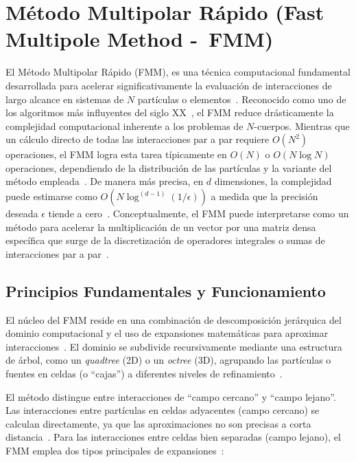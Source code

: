 \section[Método Multipolar Rápido]{Método Multipolar Rápido (Fast Multipole Method -\ FMM)}\label{subsec:fmm}

El Método Multipolar Rápido (FMM), es una técnica computacional fundamental desarrollada para acelerar significativamente la evaluación de interacciones de largo alcance en sistemas de $N$ partículas o elementos~\cite{GreengardRokhlin1987, Martinsson2012}. Reconocido como uno de los algoritmos más influyentes del siglo XX~\cite{Cipra2000}, el FMM reduce drásticamente la complejidad computacional inherente a los problemas de $N$-cuerpos. Mientras que un cálculo directo de todas las interacciones par a par requiere $O(N^2)$ operaciones, el FMM logra esta tarea típicamente en $O(N)$ o $O(N \log N)$ operaciones, dependiendo de la distribución de las partículas y la variante del método empleada~\cite{BeatsonGreengard1997, GreengardRokhlin1987}. De manera más precisa, en $d$ dimensiones, la complejidad puede estimarse como $O(N \log^{(d-1)}(1/\epsilon))$ a medida que la precisión deseada $\epsilon$ tiende a cero~\cite{Martinsson2012}. Conceptualmente, el FMM puede interpretarse como un método para acelerar la multiplicación de un vector por una matriz densa específica que surge de la discretización de operadores integrales o sumas de interacciones par a par~\cite{ChenSF, Martinsson2012}.

\subsection{Principios Fundamentales y Funcionamiento}

El núcleo del FMM reside en una combinación de descomposición jerárquica del dominio computacional y el uso de expansiones matemáticas para aproximar interacciones~\cite{GreengardRokhlin1987}. El dominio se subdivide recursivamente mediante una estructura de árbol, como un \textit{quadtree} (2D) o un \textit{octree} (3D), agrupando las partículas o fuentes en celdas (o ``cajas'') a diferentes niveles de refinamiento~\cite{BeatsonGreengard1997, Martinsson2012}.

El método distingue entre interacciones de ``campo cercano'' y ``campo lejano''. Las interacciones entre partículas en celdas adyacentes (campo cercano) se calculan directamente, ya que las aproximaciones no son precisas a corta distancia~\cite{ChenSF, Ying2012}. Para las interacciones entre celdas bien separadas (campo lejano), el FMM emplea dos tipos principales de expansiones~\cite{GreengardRokhlin1987, Martinsson2012}:

